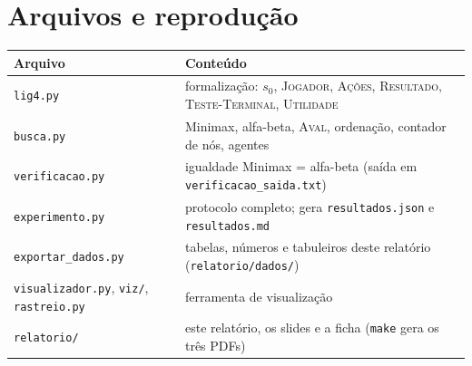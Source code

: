 \documentclass[11pt,a4paper]{article}
\newcommand{\fn}[1]{\textsc{#1}}            %
\newcommand{\arq}[1]{\texttt{#1}}
\begin{document}
\section{Arquivos e reprodução}

\begin{center}\small
\begin{tabularx}{\linewidth}{lY}
\toprule
Arquivo & Conteúdo \\
\midrule
\arq{lig4.py} & formalização: $s_0$, \fn{Jogador}, \fn{Ações}, \fn{Resultado}, \fn{Teste-Terminal}, \fn{Utilidade} \\
\arq{busca.py} & Minimax, alfa-beta, \fn{Aval}, ordenação, contador de nós, agentes \\
\arq{verificacao.py} & igualdade Minimax = alfa-beta (saída em \arq{verificacao\_saida.txt}) \\
\arq{experimento.py} & protocolo completo; gera \arq{resultados.json} e \arq{resultados.md} \\
\arq{exportar\_dados.py} & tabelas, números e tabuleiros deste relatório (\arq{relatorio/dados/}) \\
\arq{visualizador.py}, \arq{viz/}, \arq{rastreio.py} & ferramenta de visualização \\
\arq{relatorio/} & este relatório, os slides e a ficha (\arq{make} gera os três PDFs) \\
\bottomrule
\end{tabularx}
\end{center}
\end{document}
